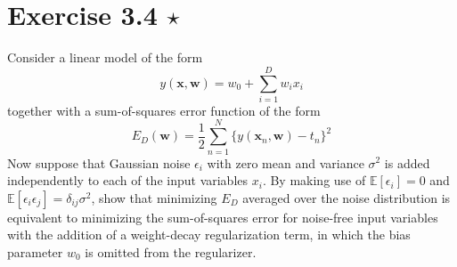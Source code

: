 \section*{Exercise 3.4 $\star$}
Consider a linear model of the form
\begin{equation}\label{eq:3.105}\tag{3.105}
    y(\mathbf{x}, \mathbf{w}) = w_0 + \sum_{i=1}^{D} w_ix_i
\end{equation}
together with a sum-of-squares error function of 
the form
\begin{equation}\label{eq:3.106}\tag{3.106}
    E_D(\mathbf{w}) = \frac{1}{2} \sum_{n=1}^{N}
    \{y(\mathbf{x}_n, \mathbf{w}) - t_n\}^2
\end{equation}
Now suppose that Gaussian noise $\epsilon_i$ with zero
mean and variance $\sigma^2$ is added independently
to each of the input variables $x_i$. By making
use of $\mathbb{E}[\epsilon_i] = 0$ and 
$\mathbb{E}[\epsilon_i\epsilon_j] = \delta_{ij}\sigma^2$,
show that minimizing $E_D$ averaged over the noise 
distribution is equivalent to minimizing the 
sum-of-squares error for noise-free input variables
with the addition of a weight-decay regularization term,
in which the bias parameter $w_0$ is omitted from
the regularizer.

\vspace{1em}

